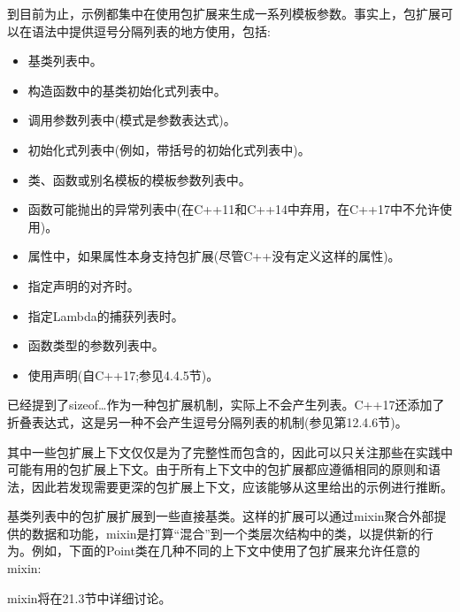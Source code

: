 
到目前为止，示例都集中在使用包扩展来生成一系列模板参数。事实上，包扩展可以在语法中提供逗号分隔列表的地方使用，包括:

\begin{itemize}
\item 
基类列表中。

\item 
构造函数中的基类初始化式列表中。

\item 
调用参数列表中(模式是参数表达式)。

\item 
初始化式列表中(例如，带括号的初始化式列表中)。

\item 
类、函数或别名模板的模板参数列表中。

\item 
函数可能抛出的异常列表中(在C++11和C++14中弃用，在C++17中不允许使用)。

\item 
属性中，如果属性本身支持包扩展(尽管C++没有定义这样的属性)。

\item 
指定声明的对齐时。

\item 
指定Lambda的捕获列表时。

\item 
函数类型的参数列表中。

\item 
使用声明(自C++17;参见4.4.5节)。
\end{itemize}

已经提到了sizeof…作为一种包扩展机制，实际上不会产生列表。C++17还添加了折叠表达式，这是另一种不会产生逗号分隔列表的机制(参见第12.4.6节)。

其中一些包扩展上下文仅仅是为了完整性而包含的，因此可以只关注那些在实践中可能有用的包扩展上下文。由于所有上下文中的包扩展都应遵循相同的原则和语法，因此若发现需要更深的包扩展上下文，应该能够从这里给出的示例进行推断。

基类列表中的包扩展扩展到一些直接基类。这样的扩展可以通过mixin聚合外部提供的数据和功能，mixin是打算“混合”到一个类层次结构中的类，以提供新的行为。例如，下面的Point类在几种不同的上下文中使用了包扩展来允许任意的mixin:

\begin{tcolorbox}[colback=webgreen!5!white,colframe=webgreen!75!black]
\hspace*{0.75cm}mixin将在21.3节中详细讨论。
\end{tcolorbox}

